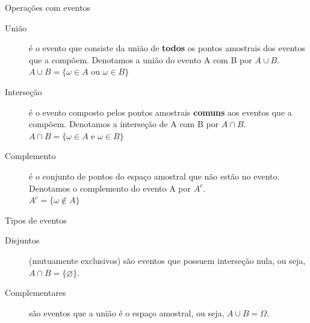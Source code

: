 \documentclass[10pt]{beamer}\usepackage[]{graphicx}\usepackage[]{color}
\theoremstyle{definition}
\begin{document}
\begin{frame}{Operações com eventos}
  \begin{block}{}
\begin{description}
 \item[União] é o evento que consiste da união de \textbf{todos} os pontos
   amostrais dos eventos que a compõem. Denotamos a união do evento A
   com B por $A\cup B$.\\
   $A \cup B = \{\omega \in A \text{ ou } \omega \in B\}$
 \item[Interseção] é o evento composto pelos pontos amostrais
   \textbf{comuns} aos eventos que a compõem. Denotamos a interseção de
   A com B por $A\cap B$.\\
   $A \cap B = \{\omega \in A \text{ e } \omega \in B\}$
 \item[Complemento] é o conjunto de pontos do espaço amostral que não
   estão no evento. Denotamos o complemento do evento A por $A^c$.\\
   $A^c = \{\omega \not\in A \}$
\end{description}
\end{block}
\end{frame}

\begin{frame}[fragile]{Tipos de eventos}
\begin{block}{}
\begin{description}
 \item[Disjuntos] (mutuamente exclusivos) são eventos que possuem
   interseção nula, ou seja, $A\cap B = \{\varnothing\}$.
 \item[Complementares] são eventos que a união é o espaço amostral, ou
   seja, $A\cup B = \Omega$.
\end{description}
\end{block}
\end{frame}



\end{document}
